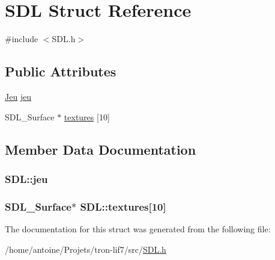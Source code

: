 \hypertarget{structSDL}{\section{S\-D\-L Struct Reference}
\label{structSDL}
}


{\ttfamily \#include $<$S\-D\-L.\-h$>$}

\subsection*{Public Attributes}
\begin{DoxyCompactItemize}
\item 
\hyperlink{structJeu}{Jeu} \hyperlink{structSDL_aed6e34a843f7e278abbc6401e7a86748}{jeu}
\item 
S\-D\-L\-\_\-\-Surface $\ast$ \hyperlink{structSDL_afa10c1c04f5aab98a52ad375fd6b9c8c}{textures} \mbox{[}10\mbox{]}
\end{DoxyCompactItemize}


\subsection{Member Data Documentation}
\hypertarget{structSDL_aed6e34a843f7e278abbc6401e7a86748}{
\subsubsection[{jeu}]{ S\-D\-L\-::jeu}}\label{structSDL_aed6e34a843f7e278abbc6401e7a86748}
\hypertarget{structSDL_afa10c1c04f5aab98a52ad375fd6b9c8c}{
\subsubsection[{textures}]{\setlength{\rightskip}{0pt plus 5cm}S\-D\-L\-\_\-\-Surface$\ast$ S\-D\-L\-::textures\mbox{[}10\mbox{]}}}\label{structSDL_afa10c1c04f5aab98a52ad375fd6b9c8c}


The documentation for this struct was generated from the following file\-:\begin{DoxyCompactItemize}
\item 
/home/antoine/\-Projets/tron-\/lif7/src/\hyperlink{SDL_8h}{S\-D\-L.\-h}\end{DoxyCompactItemize}
